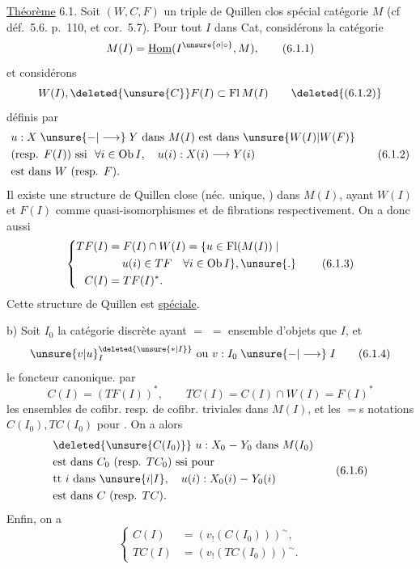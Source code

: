 \uline{Théorème} 6.1. Soit  $(W,C,F)$ un triple
de Quillen clos spécial   catégorie $M$
(cf déf.~5.6. p.~110, et cor.~5.7). Pour
tout $I$ dans Cat, considérons la catégorie
\[
 M(I)=\underline{\mathrm{Hom}}(I^{\unsure{o|\circ}},M),\tag*{(6.1.1)}
\]
et  considérons
\[
 W(I),\deleted{\unsure{C}}F(I)\subset\mathrm{Fl}\,M(I)\tag*{\deleted{(6.1.2)}}
\]
définis par
\[
\begin{aligned}
 &u:X\mathrel{\unsure{-|\longrightarrow}}Y\ \text{dans }M(I)\text{ est dans }\unsure{W(I)|W(F)}\\
 &\text{(resp. }F(I))\ \text{ssi }\ \forall i\in\mathrm{Ob}\,I,\quad u(i):X(i)\longrightarrow Y(i)\\
 &\text{est dans }W\ \text{(resp. }F).
\end{aligned}\tag*{(6.1.2)}
\]
  Il existe une structure de
Quillen close (néc. unique, ) dans $M(I)$,
ayant $W(I)$ et $F(I)$ comme  
quasi-isomorphismes et de fibrations
respectivement. On a donc aussi
\[
\left\{\begin{aligned}
 TF(I)&=F(I)\cap W(I)=\{u\in\mathrm{Fl}(M(I))\mid\\
 &\hspace{1.25em}u(i)\in TF\quad\forall i\in\mathrm{Ob}\,I\},\unsure{.}\\
 C(I)&=TF(I)^{*}.
\end{aligned}\right.\tag*{(6.1.3)}
\]
Cette structure de Quillen est \uline{spéciale}.


b) Soit $I_{0}$ la catégorie discrète ayant $=$
$=$ ensemble d'objets que $I$, et
\[
 \unsure{v|u}_{I}^{\deleted{\unsure{*|I}}}\ \text{ou }v:I_{0}\mathrel{\unsure{-|\longrightarrow}}I\tag*{(6.1.4)}
\]
le foncteur canonique.  par
\[
 C(I)=(TF(I))^{*},\qquad TC(I)=C(I)\cap W(I)=F(I)^{*}\tag*{(6.1.5)}
\]
les ensembles de cofibr. resp. de cofibr.
triviales dans $M(I)$, et  les
$=$s notations $C(I_{0}),TC(I_{0})$ pour . On
a alors
\[
\begin{aligned}
 &\deleted{\unsure{C(I_{0})}}\ u:X_{0}\mathrel{-}Y_{0}\ \text{dans }M(I_{0})\\
 &\text{est dans } C_{0}\ \text{(resp. }TC_{0})\ \text{ssi pour}\\
 &\text{tt }i\ \text{dans }\unsure{i|I},\quad u(i):X_{0}(i)\mathrel{-}Y_{0}(i)\\
 &\text{est dans }C\ \text{(resp. }TC).
\end{aligned}\tag*{(6.1.6)}
\]
Enfin, on a
\[
\left\{\begin{aligned}
 C(I)&=(v_{!}(C(I_{0})))^{\sim},\\
 TC(I)&=(v_{!}(TC(I_{0})))^{\sim}.
\end{aligned}\right.\tag*{(6.1.7.)}
\]

